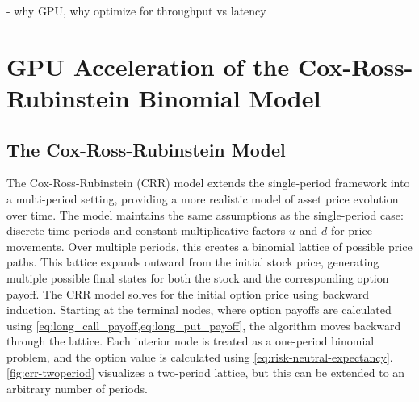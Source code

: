 \documentclass[english,12pt,a4paper,pdftex,sci,utf8]{aaltothesis}
\begin{document}
- why GPU, why optimize for throughput vs latency


\clearpage

\section{GPU Acceleration of the Cox-Ross-Rubinstein Binomial Model} \label{sec:gpu-crr}

\subsection{The Cox-Ross-Rubinstein Model}

The Cox-Ross-Rubinstein (CRR) model extends the single-period framework into a multi-period setting, providing a more realistic model of asset price evolution over time. The model maintains the same assumptions as the single-period case: discrete time periods and constant multiplicative factors $u$ and $d$ for price movements. Over multiple periods, this creates a binomial lattice of possible price paths. This lattice expands outward from the initial stock price, generating multiple possible final states for both the stock and the corresponding option payoff. The CRR model solves for the initial option price using backward induction. Starting at the terminal nodes, where option payoffs are calculated using \cref{eq:long_call_payoff,eq:long_put_payoff}, the algorithm moves backward through the lattice. Each interior node is treated as a one-period binomial problem, and the option value is calculated using \cref{eq:risk-neutral-expectancy}. \cref{fig:crr-twoperiod} visualizes a two-period lattice, but this can be extended to an arbitrary number of periods. \cite{cox1979option}
\end{document}
